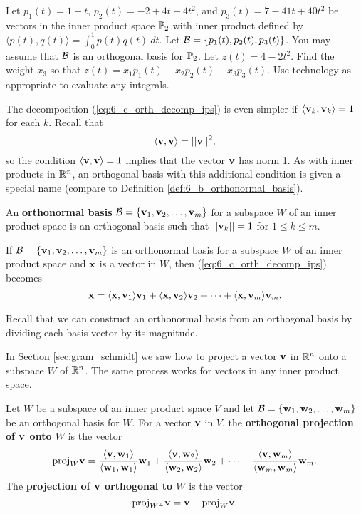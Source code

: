 \begin{activity} Let $p_1(t) = 1-t$, $p_2(t) = -2+4t+4t^2$, and $p_3(t) = 7-41t+40t^2$ be vectors in the inner product space $\mathbb{P}_2$ with inner product defined by $\langle p(t), q(t) \rangle = \int_0^1 p(t)q(t) \ dt$. Let $\mathcal{B} = \{p_1(t), p_2(t), p_3(t)\}$. You may assume that $\mathcal{B}$ is an orthogonal basis for $\mathbb{P}_2$. Let $z(t) = 4-2t^2$. Find the weight $x_3$ so that $z(t) = x_1p_1(t) + x_2 p_2(t) + x_3 p_3(t)$. Use technology as appropriate to evaluate any integrals. 

\end{activity}


The decomposition (\ref{eq:6_c_orth_decomp_ips}) is even simpler if $\langle \mathbf{v}_k, \mathbf{v}_k \rangle = 1$ for each $k$. Recall that
\[\langle \mathbf{v}, \mathbf{v} \rangle = || \mathbf{v} ||^2,\]
so the condition $\langle \mathbf{v}, \mathbf{v} \rangle  = 1$ implies that the vector $\mathbf{v}$ has norm 1. As with inner products in $\mathbb{R}^n$, an orthogonal basis with this additional condition is given a special name (compare to Definition \ref{def:6_b_orthonormal_basis}).

\begin{definition} An \textbf{orthonormal basis} $\mathcal{B} = \{\mathbf{v}_1, \mathbf{v}_2, \ldots, \mathbf{v}_m\}$ for a subspace $W$ of an inner product space is an orthogonal basis such that $|| \mathbf{v}_k || = 1$ for $1\leq k\leq m$.
\end{definition}

If $\mathcal{B} = \{\mathbf{v}_1, \mathbf{v}_2, \ldots, \mathbf{v}_m\}$ is an orthonormal basis for a subspace $W$ of an inner product space and $\mathbf{x}$ is a vector in $W$, then  (\ref{eq:6_c_orth_decomp_ips}) becomes
\begin{equation}
\mathbf{x} = \langle \mathbf{x}, \mathbf{v}_1 \rangle \mathbf{v}_1 +  \langle \mathbf{x}, \mathbf{v}_2 \rangle \mathbf{v}_2 + \cdots + \langle \mathbf{x}, \mathbf{v}_m \rangle \mathbf{v}_m. \label{eq:6_c_orthnorm_decomp_ips}
\end{equation}

Recall that we can construct an orthonormal basis from an orthogonal basis by dividing each basis vector by its magnitude.



In Section \ref{sec:gram_schmidt} we saw how to project a vector $\mathbf{v}$ in $\mathbb{R}^n$ onto a subspace $W$ of $\mathbb{R}^n$. The same process works for vectors in any inner product space.

\begin{definition} Let $W$ be a subspace of an inner product space $V$ and let $\mathcal{B} = \{\mathbf{w}_1, \mathbf{w}_2, \ldots, \mathbf{w}_m\}$ be an orthogonal basis for $W$. For a vector $\mathbf{v}$ in $V$, the \textbf{orthogonal projection of $\mathbf{v}$ onto $W$} is the vector
\[\text{proj}_W \mathbf{v} =  \frac{\langle \mathbf{v}, \mathbf{w}_1 \rangle }{\langle \mathbf{w}_1, \mathbf{w}_1 \rangle } \mathbf{w}_1 + \frac{\langle \mathbf{v}, \mathbf{w}_2 \rangle }{\langle \mathbf{w}_2, \mathbf{w}_2 \rangle }  \mathbf{w}_2 + \cdots + \frac{\langle \mathbf{v}, \mathbf{w}_m \rangle}{\langle \mathbf{w}_m, \mathbf{w}_m \rangle} \mathbf{w}_m.\] 
The \textbf{projection of $\mathbf{v}$ orthogonal to $W$} is the vector
\[\text{proj}_{W^{\perp}} \mathbf{v} = \mathbf{v} - \text{proj}_W \mathbf{v}.\]
\end{definition}

